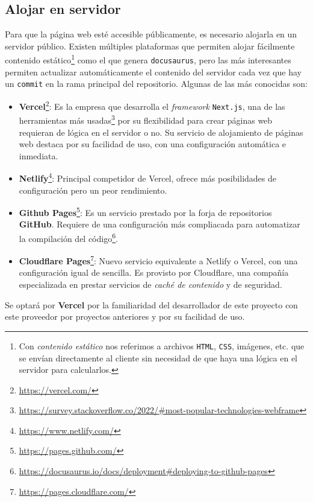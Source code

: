 \subsection{Alojar en servidor}

Para que la página web esté accesible públicamente, es necesario alojarla en un servidor público. Existen múltiples plataformas que permiten alojar fácilmente contenido estático\footnote{Con \textit{contenido estático} nos referimos a archivos \texttt{HTML}, \texttt{CSS}, imágenes, etc. que se envían directamente al cliente sin necesidad de que haya una lógica en el servidor para calcularlos.} como el que genera \texttt{docusaurus}, pero las más interesantes permiten actualizar automáticamente el contenido del servidor cada vez que hay un \texttt{commit} en la rama principal del repositorio. Algunas de las más conocidas son:

\begin{itemize}
    \item \textbf{Vercel}\footnote{\url{https://vercel.com/}}: Es la empresa que desarrolla el \textit{framework} \texttt{Next.js}, una de las herramientas más usadas\footnote{\url{https://survey.stackoverflow.co/2022/\#most-popular-technologies-webframe}} por su flexibilidad para crear páginas web requieran de lógica en el servidor o no. Su servicio de alojamiento de páginas web destaca por su facilidad de uso, con una configuración automática e inmediata.
    \item \textbf{Netlify}\footnote{\url{https://www.netlify.com/}}: Principal competidor de Vercel, ofrece más posibilidades de configuración pero un peor rendimiento.
    \item \textbf{Github Pages}\footnote{\url{https://pages.github.com/}}: Es un servicio prestado por la forja de repositorios \textbf{GitHub}. Requiere de una configuración más compliacada para automatizar la compilación del código\footnote{\url{https://docusaurus.io/docs/deployment\#deploying-to-github-pages}}.
    \item \textbf{Cloudflare Pages}\footnote{\url{https://pages.cloudflare.com/}}: Nuevo servicio equivalente a Netlify o Vercel, con una configuración igual de sencilla. Es provisto por Cloudflare, una compañía especializada en prestar servicios de \textit{caché de contenido} y de seguridad.
\end{itemize}

Se optará por \textbf{Vercel} por la familiaridad del desarrollador de este proyecto con este proveedor por proyectos anteriores y por su facilidad de uso.

